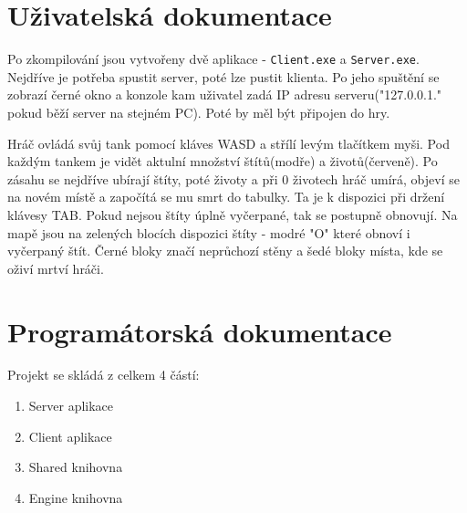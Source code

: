 \documentclass[a4paper,hidelinks]{report}
\begin{document}
\chapter{Uživatelská dokumentace}
Po zkompilování jsou vytvořeny dvě aplikace - \texttt{Client.exe} a \texttt{Server.exe}. Nejdříve je potřeba spustit server, poté lze pustit klienta. Po jeho spuštění se zobrazí černé okno a konzole kam uživatel zadá IP adresu serveru("127.0.0.1." pokud běží server na stejném PC). Poté by měl být připojen do hry.

Hráč ovládá svůj tank pomocí kláves WASD a střílí levým tlačítkem myši. Pod každým tankem je vidět aktulní množství štítů(modře) a životů(červeně). Po zásahu se nejdříve ubírají štíty, poté životy a při 0 životech hráč umírá, objeví se na novém místě a započítá se mu smrt do tabulky. Ta je k dispozici při držení klávesy TAB. Pokud nejsou štíty úplně vyčerpané, tak se postupně obnovují. Na mapě jsou na zelených blocích dispozici štíty - modré "O" které obnoví i vyčerpaný štít. Černé bloky značí neprůchozí stěny a šedé bloky místa, kde se oživí mrtví hráči.

\chapter{Programátorská dokumentace}
Projekt se skládá z celkem 4 částí:
\begin{enumerate}
	\item Server aplikace
	\item Client aplikace
	\item Shared knihovna
	\item Engine knihovna
\end{enumerate}
\end{document}
